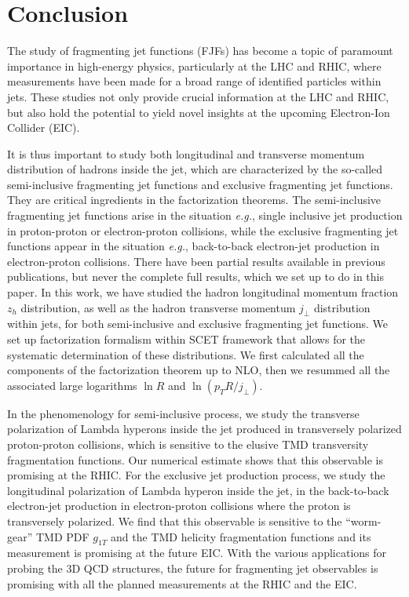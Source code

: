\documentclass[a4paper, 11 pt]{article}
\begin{document}
\section{Conclusion}
\label{s.conclusion}

The study of fragmenting jet functions (FJFs) has become a topic of paramount importance in high-energy physics, particularly at the LHC and RHIC, where measurements have been made for a broad range of identified particles within jets.
These studies not only provide crucial information at the LHC and RHIC, but also hold the potential to yield novel insights at the upcoming Electron-Ion Collider (EIC). 

It is thus important to study both longitudinal and transverse momentum distribution of hadrons inside the jet, which are characterized by the so-called semi-inclusive fragmenting jet functions and exclusive fragmenting jet functions.
They are critical ingredients in the factorization theorems.
The semi-inclusive fragmenting jet functions arise in the situation \textit{e.g.}, single inclusive jet production in proton-proton or electron-proton collisions, while the exclusive fragmenting jet functions appear in the situation \textit{e.g.}, back-to-back electron-jet production in electron-proton collisions.
There have been partial results available in previous publications, but never the complete full results, which we set up to do in this paper.
In this work, we have studied the hadron longitudinal momentum fraction $z_h$ distribution, as well as the hadron transverse momentum $j_{\perp}$ distribution within jets, for both semi-inclusive and exclusive fragmenting jet functions.
We set up factorization formalism within SCET framework that allows for the systematic determination of these distributions.
We first calculated all the components of the factorization theorem up to NLO, then we resummed all the associated large logarithms $\ln{R}$ and $\ln(p_T R / j_{\perp})$.

In the phenomenology for semi-inclusive process, we study the transverse polarization of Lambda hyperons inside the jet produced in transversely polarized proton-proton collisions, which is sensitive to the elusive TMD transversity fragmentation functions.
Our numerical estimate shows that this observable is promising at the RHIC.
For the exclusive jet production process, we study the longitudinal polarization of Lambda hyperon inside the jet, in the back-to-back electron-jet production in electron-proton collisions where the proton is transversely polarized.
We find that this observable is sensitive to the ``worm-gear'' TMD PDF $g_{1T}$ and the TMD helicity fragmentation functions and its measurement is promising at the future EIC.
With the various applications for probing the 3D QCD structures, the future for fragmenting jet observables is promising with all the planned measurements at the RHIC and the EIC.
\end{document}
